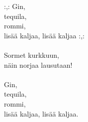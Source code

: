 
            :,: Gin, \\
            tequila, \\
            rommi, \\
            lisää kaljaa, lisää kaljaa :,: \\
\hspace{10mm} \\
            Sormet kurkkuun, \\
            näin norjaa lausutaan! \\
\hspace{10mm} \\
            Gin, \\
            tequila, \\
            rommi, \\
            lisää kaljaa, lisää kaljaa. \\
